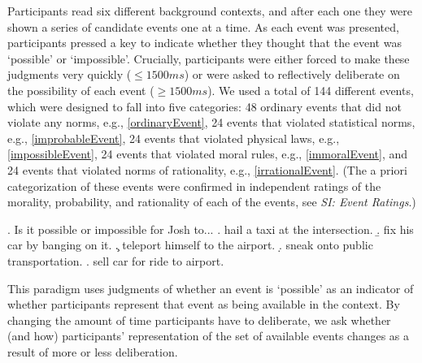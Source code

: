\documentclass[9pt,twocolumn,twoside]{pnas-new}
\begin{document}
\noindent Participants read six different background contexts, and after each one they were shown a series of candidate events one at a time. As each event was presented, participants pressed a key to indicate whether they thought that the event was `possible' or `impossible'. Crucially, participants were either forced to make these judgments very quickly ($\leq 1500 ms$) or were asked to reflectively deliberate on the possibility of each event ($\geq 1500 ms$). We used a total of 144 different events, which were designed to fall into five categories: 48 ordinary events that did not violate any norms, e.g., \ref{ordinaryEvent}, 24 events that violated statistical norms, e.g., \ref{improbableEvent}, 24 events that violated physical laws, e.g., \ref{impossibleEvent}, 24 events that violated moral rules, e.g., \ref{immoralEvent}, and 24 events that violated norms of rationality, e.g., \ref{irrationalEvent}. (The a priori categorization of these events were confirmed in independent ratings of the morality, probability, and rationality of each of the events, see \textit{SI: Event Ratings}.)

\ex.  Is it possible or impossible for Josh to...
\a. \label{ordinaryEvent} hail a taxi at the intersection.
\b. \label{improbableEvent} fix his car by banging on it.
\c. \label{impossibleEvent} teleport himself to the airport.
\d. \label{immoralEvent} sneak onto public transportation.
\e. \label{irrationalEvent} sell car for ride to airport.

This paradigm uses judgments of whether an event is `possible' as an indicator of whether participants represent that event as being available in the context. By changing the amount of time participants have to deliberate, we ask whether (and how) participants' representation of the set of available events changes as a result of more or less deliberation.
\end{document}

